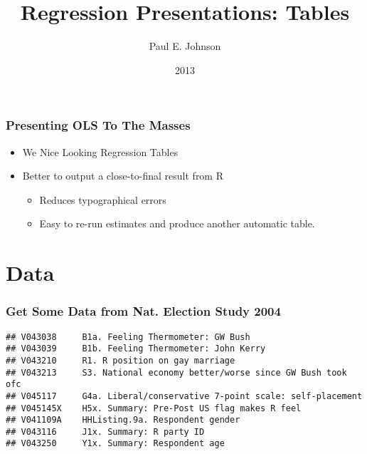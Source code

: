 \documentclass[11pt,english]{beamer}
\def\lyxframeend{} %
\def\Sweavesize{\normalsize}
\def\Rcolor{\color{black}}
\def\Rbackground{\color[gray]{0.95}}
\newcommand\makebeamertitle{\frame{\maketitle}}%
\begin{document}

\def\Sweavesize{\normalsize} 
\def\Rcolor{\color{black}} 
\def\Rbackground{\color[gray]{0.90}}




\title[Descriptive]{Regression Presentations: Tables }


\author{Paul E. Johnson \and {}}




\date[2013]{2013}

\makebeamertitle

\lyxframeend{}


\begin{frame}

\frametitle{Presenting OLS To The Masses}
\begin{itemize}
\item We Nice Looking Regression Tables
\item Better to output a close-to-final result from R

\begin{itemize}
\item Reduces typographical errors
\item Easy to re-run estimates and produce another automatic table.
\end{itemize}
\end{itemize}
\end{frame}


\lyxframeend{}\section{Data}

\begin{frame}
\frametitle{Get Some Data from Nat. Election Study 2004}



\begin{lstlisting}[basicstyle={\footnotesize}]
## V043038     B1a. Feeling Thermometer: GW Bush
## V043039     B1b. Feeling Thermometer: John Kerry
## V043210     R1. R position on gay marriage
## V043213     S3. National economy better/worse since GW Bush took ofc
## V045117     G4a. Liberal/conservative 7-point scale: self-placement
## V045145X    H5x. Summary: Pre-Post US flag makes R feel
## V041109A    HHListing.9a. Respondent gender
## V043116     J1x. Summary: R party ID
## V043250     Y1x. Summary: Respondent age
\end{lstlisting}

\end{frame}
\end{document}
